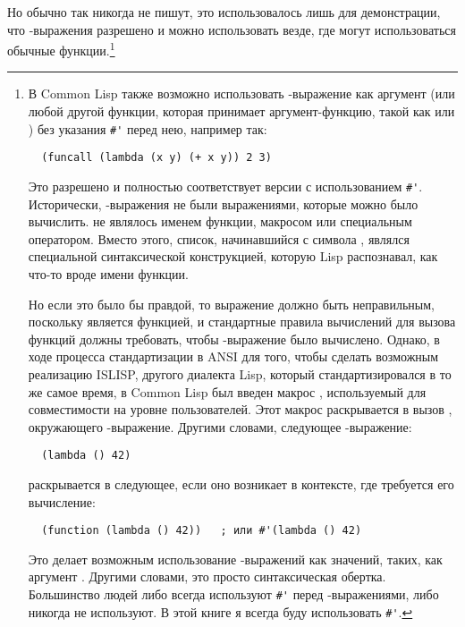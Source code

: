   Но обычно так никогда не пишут, это использовалось лишь для демонстрации, что
  -выражения разрешено и можно использовать везде, где могут использоваться
  обычные функции.\footnote{В Common Lisp также возможно использовать
    -выражение как аргумент  (или любой другой функции, которая
    принимает аргумент-функцию, такой как  или ) без указания
    \lstinline!#'! перед нею, например так:

\begin{lstlisting}
  (funcall (lambda (x y) (+ x y)) 2 3)
\end{lstlisting}

Это разрешено и полностью соответствует версии с использованием \lstinline!#'!.  Исторически,
-выражения не были выражениями, которые можно было вычислить.  
не являлось именем функции, макросом или специальным оператором.  Вместо этого, список,
начинавшийся с символа , являлся специальной синтаксической конструкцией,
которую Lisp распознавал, как что-то вроде имени функции.

Но если это было бы правдой, то выражение  должно быть
неправильным, поскольку  является функцией, и стандартные правила вычислений
для вызова функций должны требовать, чтобы -выражение было вычислено.
Однако, в ходе процесса стандартизации в ANSI для того, чтобы сделать возможным реализацию
ISLISP, другого диалекта Lisp, который стандартизировался в то же самое время, в Common
Lisp был введен макрос , используемый для совместимости на уровне
пользователей.  Этот макрос раскрывается в вызов , окружающего
-выражение.  Другими словами, следующее -выражение:

\begin{lstlisting}
  (lambda () 42)
\end{lstlisting}

раскрывается в следующее, если оно возникает в контексте, где требуется его вычисление:

\begin{lstlisting}
  (function (lambda () 42))   ; или #'(lambda () 42)
\end{lstlisting}

Это делает возможным использование -выражений как значений, таких, как
аргумент .  Другими словами, это просто синтаксическая обертка.  Большинство
людей либо всегда используют \lstinline!#'! перед -выражениями, либо никогда
не используют.  В этой книге я всегда буду использовать \lstinline!#'!.}

